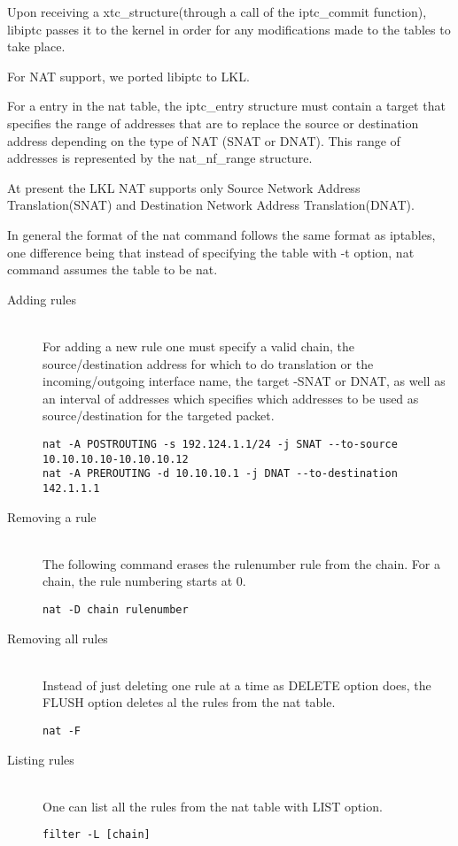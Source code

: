 \lstset{language=C, caption=TC_INIT}


Upon receiving a xtc_structure(through a call of the iptc_commit function), libiptc passes it to the kernel in order for any modifications made to the tables to take place.

For NAT support, we ported libiptc to LKL.

For a entry in the nat table, the iptc_entry structure must contain a target that specifies the range of addresses that are to replace the source or destination address depending on the type of NAT (SNAT or DNAT). This range of addresses is represented by the nat_nf_range structure.

\lstset{language=C, caption=struct nat_nf_range}


At present the LKL NAT supports only  Source Network Address Translation(SNAT) and  Destination Network Address Translation(DNAT).

In general the format of the nat command follows the same format as iptables, one difference being that instead of specifying the table with -t option, nat command assumes the table to be nat. 
\begin{description}
\item [Adding rules] \hfill \\
For adding a new rule one must specify a valid chain, the source/destination address for which to do translation or the incoming/outgoing interface name, the target -SNAT or DNAT, as well as an interval of addresses which specifies which addresses to be used as source/destination for the targeted packet.
\lstset{language=zsh,caption=Adding a rule,label=lst:saddrule}
\begin{lstlisting}
nat -A POSTROUTING -s 192.124.1.1/24 -j SNAT --to-source 10.10.10.10-10.10.10.12
nat -A PREROUTING -d 10.10.10.1 -j DNAT --to-destination 142.1.1.1
\end{lstlisting}
\item[Removing a rule] \hfill \\
The following command erases the rulenumber rule from the chain. For a chain, the rule numbering starts at 0.
\lstset{language=zsh,caption=Deleting a rule,label=lst:sdelrule}
\begin{lstlisting}
nat -D chain rulenumber
\end{lstlisting}
\item[Removing all rules] \hfill \\
Instead of just deleting one rule at a time as DELETE option does, the FLUSH option deletes al the rules from the nat table.
\lstset{language=zsh,caption=Deleting all rules,label=lst:sdelallrules}
\begin{lstlisting}
nat -F
\end{lstlisting}
\item [Listing rules] \hfill \\
One can list all the rules from the nat table with LIST option.
\lstset{language=zsh,caption=List rules,label=lst:slstrule}
\begin{lstlisting}
filter -L [chain]
\end{lstlisting}
\end{description}

